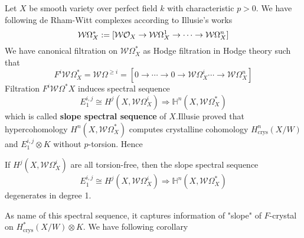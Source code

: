 \documentclass[11pt,a4paper]{scmsnotes}
\begin{document}
Let $X$ be smooth variety over perfect field $k$ with characteristic $p >0$. We have following de Rham-Witt complexes according to Illusie's works
\begin{equation}
\mathcal{W} \Omega^*_{X}:= [\mathcal{W}\mathcal{O}_{X} \to \mathcal{W}\Omega^1_X \to \cdots \to \mathcal{W} \Omega^n_X ]
\end{equation}
We have canonical filtration on $\mathcal{W} \Omega^*_X$ as Hodge filtration in Hodge theory such that
\begin{equation}
F^i \mathcal{W}\Omega^*_X = \mathcal{W} \Omega^{\geq i}= [0 \to \cdots \to 0 \to \mathcal{W}\Omega^i_X \cdots \to \mathcal{W} \Omega^n_X]
\end{equation}
Filtration ${F^i \mathcal{W}\Omega^* X }$ induces spectral sequence
\begin{equation}
E^{i,j}_1 \cong H^{j}(X, \mathcal{W} \Omega^i_X) \Rightarrow \mathbb{H}^n(X, \mathcal{W}\Omega^*_X)
\end{equation}
which is called \textbf{slope spectral sequence} of $X$.Illusie proved that hypercohomology $H^n(X, \mathcal{W} \Omega^*_X)$ computes crystalline cohomology $H^n_{\text{crys}}(X/W)$ and $E^{i,j}_1 \otimes K$ without $p$-torsion. Hence 
\begin{secthm}[Illusie]
If $H^j(X, \mathcal{W} \Omega^i_X)$ are all torsion-free, then the slope spectral sequence 
\begin{equation}
E^{i,j}_1 \cong H^{j}(X, \mathcal{W} \Omega^i_X) \Rightarrow \mathbb{H}^n(X, \mathcal{W}\Omega^*_X)
\end{equation}
degenerates in degree 1.
\end{secthm}
As name of this spectral sequence, it captures information of "slope" of $F$-crystal on $H^*_{\text{crys}}(X/W) \otimes K$. We have following corollary
\end{document}
